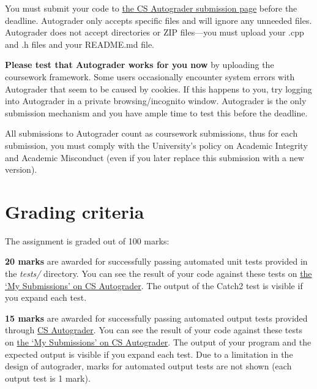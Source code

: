 \documentclass[a4paper]{article}
\newcommand\autograderlink{\href{https://csautograder.swansea.ac.uk/}{CS Autograder}}
\newcommand\submissionlink{\href{https://csautograder.swansea.ac.uk/web/project/31}{the CS Autograder submission page}}
\newcommand\mysubmissionsurl{https://csautograder.swansea.ac.uk/web/project/31?current_tab=my_submissions}
\begin{document}
You must submit your code to \submissionlink{} before the deadline. Autograder only accepts specific files and will ignore any unneeded files. Autograder does not accept directories or ZIP files—you must upload your .cpp and .h files and your README.md file. 

\textbf{Please test that Autograder works for you now} by uploading the coursework framework. Some users occasionally encounter system errors with Autograder that seem to be caused by cookies. If this happens to you, try logging into Autograder in a private browsing/incognito window. Autograder is the only submission mechanism and you have ample time to test this before the deadline. 

All submissions to Autograder count as coursework submissions, thus for each submission, you must comply with the University’s policy on Academic Integrity and Academic Misconduct (even if you later replace this submission with a new version).




\section*{Grading criteria}
The assignment is graded out of 100 marks:

\noindent{}\textbf{20 marks} are awarded for successfully passing automated unit tests provided in the \emph{tests/} directory. You can see the result of your code against these tests on \href{\mysubmissionsurl}{the `My Submissions' on CS Autograder}. The output of the Catch2 test is visible if you expand each test.

\noindent{}\textbf{15 marks} are awarded for successfully passing automated output tests provided through \autograderlink{}. You can see the result of your code against these tests on \href{\mysubmissionsurl}{the `My Submissions' on CS Autograder}. The output of your program and the expected output is visible if you expand each test. Due to a limitation in the design of autograder, marks for automated output tests are not shown (each output test is 1 mark).
\end{document}
